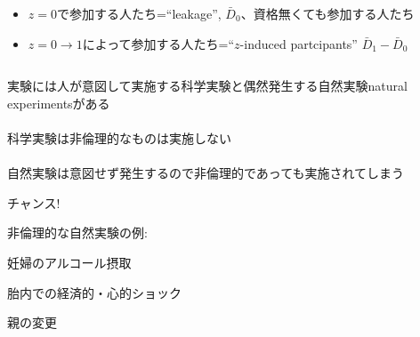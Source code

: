\begin{frame}{}
\begin{columns}[T]
\begin{itemize}
{\begin{itemize}
	\item	$z=0$で参加する人たち=``leakage'', $\bar{D}_{0}$、資格無くても参加する人たち
	\item	$z=0\rightarrow 1$によって参加する人たち=``$z$-induced partcipants'' $\bar{D}_{1}-\bar{D}_{0}$
	\end{itemize}
}
\end{itemize}
\begin{description}
\vspace{1.0ex}\setlength{\itemsep}{1.0ex}\setlength{\baselineskip}{12pt}
\end{description}
\end{columns}
\end{frame}



\begin{frame}[label=KoreanAdopteeExperiment, t]{}
実験には人が意図して実施する科学実験と偶然発生する自然実験natural experimentsがある\\~\\

\pause
科学実験は非倫理的なものは実施しない\\~\\

\pause
自然実験は意図せず発生するので非倫理的であっても実施されてしまう
\begin{dinglist}{43}
\vspace{1.0ex}\setlength{\itemsep}{1.0ex}\setlength{\baselineskip}{12pt}
\pause
\item	チャンス!
\end{dinglist}

\vspace{2ex}
\pause
非倫理的な自然実験の例:
\begin{dinglist}{45}
\vspace{1.0ex}\setlength{\itemsep}{1.0ex}\setlength{\baselineskip}{12pt}
\item	妊婦のアルコール摂取\citep{Nilsson2017}
\item	胎内での経済的・心的ショック\citep{PerssonRossinSlater2018}
\item	親の変更\citep{FagerengMogstadRonning2021}
\end{dinglist}
\end{frame}

